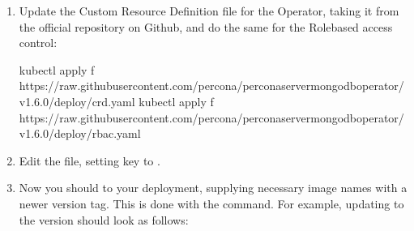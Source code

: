 \documentclass[letterpaper,10pt,english]{sphinxmanual}
\begin{document}
\begin{enumerate}
%
\item {} 
Update the Custom Resource Definition file for the Operator, taking it from
the official repository on Github, and do the same for the Role\sphinxhyphen{}based access
control:

\begin{sphinxVerbatim}[commandchars=\\\{\}]
kubectl apply \PYGZhy{}f https://raw.githubusercontent.com/percona/percona\PYGZhy{}server\PYGZhy{}mongodb\PYGZhy{}operator/v1.6.0/deploy/crd.yaml
kubectl apply \PYGZhy{}f https://raw.githubusercontent.com/percona/percona\PYGZhy{}server\PYGZhy{}mongodb\PYGZhy{}operator/v1.6.0/deploy/rbac.yaml
\end{sphinxVerbatim}

\item {} 
Edit the  file, setting  key to
.

\item {} 
Now you should  to your
deployment, supplying necessary image names with a newer version tag. This
is done with the  command. For example, updating
to the  version should look as follows:

\begin{sphinxVerbatim}[commandchars=\\\{\}]
    \PYGZbs{}
   \PYG{l+s+s1}{:[}\PYG{l+s+s1}{\PYGZcb{}]\PYGZcb{}\PYGZcb{}\PYGZcb{}\PYGZcb{}}


\end{sphinxVerbatim}
\end{enumerate}
\end{document}
